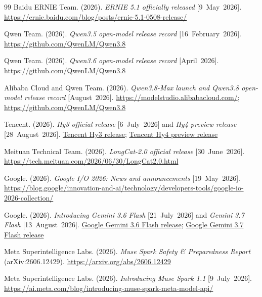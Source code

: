 \documentclass[11pt]{article}
\begin{document}
\begin{thebibliography}{99}
Baidu ERNIE Team. (2026). \emph{ERNIE 5.1 officially released} [9~May~2026].
\url{https://ernie.baidu.com/blog/posts/ernie-5.1-0508-release/}

Qwen Team. (2026). \emph{Qwen3.5 open-model release record} [16~February~2026].
\url{https://github.com/QwenLM/Qwen3.8}

Qwen Team. (2026). \emph{Qwen3.6 open-model release record} [April~2026].
\url{https://github.com/QwenLM/Qwen3.8}

Alibaba Cloud and Qwen Team. (2026). \emph{Qwen3.8-Max launch and Qwen3.8 open-model release record}
[August~2026]. \url{https://modelstudio.alibabacloud.com/};
\url{https://github.com/QwenLM/Qwen3.8}

Tencent. (2026). \emph{Hy3 official release} [6~July~2026] and \emph{Hy4 preview release}
[28~August~2026].
\href{https://www.tencent.com/tencent-hunyuan-officially-releases-hy3-advancing-agent-capabilities-and-deeper-product-integration/}{Tencent Hy3 release};
\href{https://www.tencent.com/tencent-releases-and-open-sources-tencent-hy4-preview/}{Tencent Hy4 preview release}

Meituan Technical Team. (2026). \emph{LongCat-2.0 official release} [30~June~2026].
\url{https://tech.meituan.com/2026/06/30/LongCat2.0.html}

Google. (2026). \emph{Google I/O 2026: News and announcements} [19~May~2026].
\url{https://blog.google/innovation-and-ai/technology/developers-tools/google-io-2026-collection/}

Google. (2026). \emph{Introducing Gemini 3.6 Flash} [21~July~2026] and
\emph{Gemini 3.7 Flash} [13~August~2026].
\href{https://blog.google/innovation-and-ai/models-and-research/gemini-models/gemini-3-6-flash-3-5-flash-lite-3-5-flash-cyber/}{Google Gemini 3.6 Flash release};
\href{https://blog.google/innovation-and-ai/models-and-research/gemini-models/introducing-gemini-3-7-flash/}{Google Gemini 3.7 Flash release}

Meta Superintelligence Labs. (2026). \emph{Muse Spark Safety \& Preparedness Report} (arXiv:2606.12429).
\url{https://arxiv.org/abs/2606.12429}

Meta Superintelligence Labs. (2026). \emph{Introducing Muse Spark 1.1} [9~July~2026].
\url{https://ai.meta.com/blog/introducing-muse-spark-meta-model-api/}


\end{thebibliography}
\end{document}
